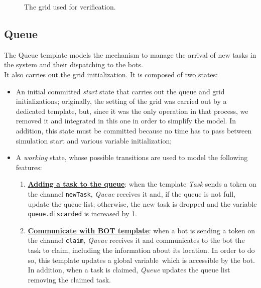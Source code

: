 \documentclass{article}
\begin{document}
\begin{figure}[H]
\begin{minipage}{0.45\textwidth}
						\caption{The grid used for verification.}
					\end{minipage}
				\end{figure}

		\subsection{Queue}
			The Queue template models the mechanism to manage the arrival of new tasks in the system and their dispatching to the bots.\\
			It also carries out the grid initialization. It is composed of two states:
			\begin{itemize}
				\item An initial committed \emph{start} state that carries out the queue and grid initializations; originally, the setting of the grid was carried out by a dedicated template, but, since it was the only operation in that process, we removed it and integrated in this one in order to simplify the model. In addition, this state must be committed because no time has to pass between simulation start and various variable initialization;
				\item A \emph{working} state, whose possible transitions are used to model the following features:
					\begin{enumerate}
						\item \textbf{\underline{Adding a task to the queue}}: when the template \emph{Task} sends a token on the channel \verb|newTask|, \emph{Queue} receives it and, if the queue is not full, update the queue list; otherwise, the new task is dropped and the variable \verb|queue.discarded| is increased by 1.
						\item \textbf{\underline{Communicate with BOT template}}: when a bot is sending a token on the channel \verb|claim|, \emph{Queue} receives it and communicates to the bot the task to claim, including the information about its location. In order to do so, this template updates a global variable\footnotemark\ which is accessible by the bot. In addition, when a task is claimed, \emph{Queue} updates the queue list removing the claimed task.
					\end{enumerate}
			\end{itemize}
\end{document}
